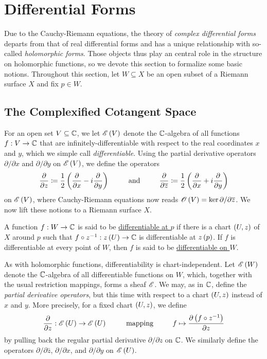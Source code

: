 \documentclass[../Moduli_Spaces_of_Riemann_Surfaces.tex]{subfiles}
\begin{document}
    \section{Differential Forms}\label{CC:sec:differential_forms}
    Due to the Cauchy-Riemann equations, the theory of \textit{complex differential forms} departs from that of real differential forms and has a unique relationship with so-called \textit{holomorphic forms}. Those objects thus play an central role in the structure on holomorphic functions, so we devote this section to formalize some basic notions. Throughout this section, let $W\subseteq X$ be an open subset of a Riemann surface $X$ and fix $p\in W$.
    \subsection{The Complexified Cotangent Space}
    For an open set $V\subseteq\mathbb{C}$, we let $\mathscr{E}\left(V\right)$ denote the $\mathbb{C}$-algebra of all functions $f:V\to\mathbb{C}$ that are infinitely-differentiable with respect to the real coordinates $x$ and $y$, which we simple call \textit{differentiable}. Using the partial derivative operators $\partial/\partial x$ and $\partial/\partial y$ on $\mathscr{E}\left(V\right)$, we define the operators
    \begin{equation*}
        \frac{\partial}{\partial z}\coloneqq\frac{1}{2}\l(\frac{\partial}{\partial x}-i\frac{\partial}{\partial y}\r)\ \ \ \ \ \ \ \ \textrm{and}\ \ \ \ \ \ \ \ \frac{\partial}{\partial\bar{z}}\coloneqq\frac{1}{2}\l(\frac{\partial}{\partial x}+i\frac{\partial}{\partial y}\r)
    \end{equation*}
    on $\mathscr{E}\left(V\right)$, where Cauchy-Riemann equations now reads $\mathscr{O}\left(V\right)=\ker\partial/\partial\overline{z}$. We now lift these notions to a Riemann surface $X$.
    \begin{definition}
        A function $f:W\to\mathbb{C}$ is said to be \ul{differentiable at $p$} if there is a chart $\left(U,z\right)$ of $X$ around $p$ such that $f\circ z^{-1}:z\left(U\right)\to\mathbb{C}$ is differentiable at $z\left(p\right)$. If $f$ is differentiable at every point of $W$, then $f$ is said to be \ul{differentiable on $W$}.
    \end{definition}
    \begin{remark}
        As with holomorphic functions, differentiability is chart-independent. Let $\mathscr{E}\left(W\right)$ denote the $\mathbb{C}$-algebra of all differentiable functions on $W$, which, together with the usual restriction mappings, forms a sheaf $\mathscr{E}$. We may, as in $\mathbb{C}$, define the \textit{partial derivative operators}, but this time with respect to a chart $\left(U,z\right)$ instead of $x$ and $y$. More precisely, for a fixed chart $\left(U,z\right)$, we define
        \begin{equation*}
            \frac{\partial}{\partial z}:\DIFF\l(U\r)\to\DIFF\l(U\r)\ \ \ \ \ \ \ \ \textrm{mapping}\ \ \ \ \ \ \ \ f\mapsto\frac{\partial\l(f\circ z^{-1}\r)}{\partial z}
        \end{equation*}
        by pulling back the regular partial derivative $\partial/\partial z$ on $\mathbb{C}$. We similarly define the operators $\partial/\partial\bar{z}$, $\partial/\partial x$, and $\partial/\partial y$ on $\mathscr{E}\left(U\right)$.\exqed
    \end{remark}
\end{document}
